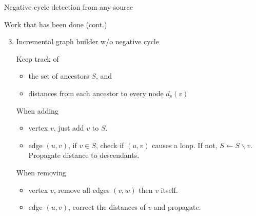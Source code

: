 \documentclass{beamer}
\begin{document}
\begin{frame}{Negative cycle detection from any source}

\vspace*{8pt}

\begin{center}
\end{center}


\end{frame}


\begin{frame}[fragile]{Work that has been done (cont.)}

\begin{enumerate}
\setcounter{enumi}{2}
\item Incremental graph builder w/o negative cycle\newline

Keep track of
\begin{itemize}
\item the set of ancestors $S$, and
\item distances from each ancestor to every node $d_s(v)$
\end{itemize}

When adding
\begin{itemize}
\item\alert{vertex $v$}, just add $v$ to $S$.
\item\alert{edge $(u,v)$}, if $v\in S$, check if $(u,v)$ causes a loop.\newline
If not, $S\leftarrow S\backslash v$. Propagate distance to descendants.
\end{itemize}

When removing
\begin{itemize}
\item\alert{vertex $v$}, remove all edges $(v,w)$ then $v$ itself.
\item\alert{edge $(u,v)$}, correct the distances of $v$ and propagate.
\end{itemize}

\end{enumerate}

\end{frame}
\end{document}

